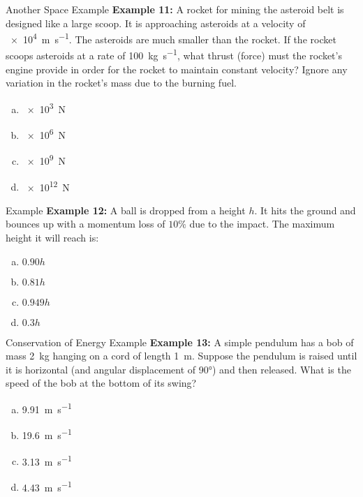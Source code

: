 \documentclass[12pt,compress,aspectratio=169]{beamer}
\begin{document}
\begin{frame}{Another Space Example}
  \textbf{Example 11:} A rocket for mining the asteroid belt is designed like a
  large scoop. It is approaching asteroids at a velocity of
  \SI{e4}{\metre\per\second}. The asteroids are much smaller than the rocket.
  If the rocket scoops asteroids at a rate of \SI{100}{\kilo\gram\per\second},
  what thrust (force) must the rocket's engine provide in order for the rocket
  to maintain constant velocity? Ignore any variation in the rocket's mass due
  to the burning fuel.
  \begin{enumerate}[(a)]
  \item \SI{e3}{\newton}
  \item \SI{e6}{\newton}
  \item \SI{e9}{\newton}
  \item \SI{e12}{\newton}
  \end{enumerate}
\end{frame}



\begin{frame}{Example}
  \textbf{Example 12:} A ball is dropped from a height $h$. It hits the ground
  and bounces up with a momentum loss of $10\%$ due to the impact. The maximum
  height it will reach is:
  \begin{enumerate}[(a)]
  \item $0.90h$
  \item $0.81h$
  \item $0.949h$
  \item $0.3h$
  \end{enumerate}
\end{frame}



\begin{frame}{Conservation of Energy Example}
  \textbf{Example 13:} A simple pendulum has a bob of mass \SI{2}{\kilo\gram}
  hanging on a cord of length \SI{1}{\metre}. Suppose the pendulum is raised
  until it is horizontal (and angular displacement of \ang{90}) and then
  released. What is the speed of the bob at the bottom of its swing?
  \begin{enumerate}[(a)]
  \item\SI{9.91}{\metre\per\second}
  \item\SI{19.6}{\metre\per\second}
  \item\SI{3.13}{\metre\per\second}
  \item\SI{4.43}{\metre\per\second}
  \end{enumerate}
\end{frame}
\end{document}
